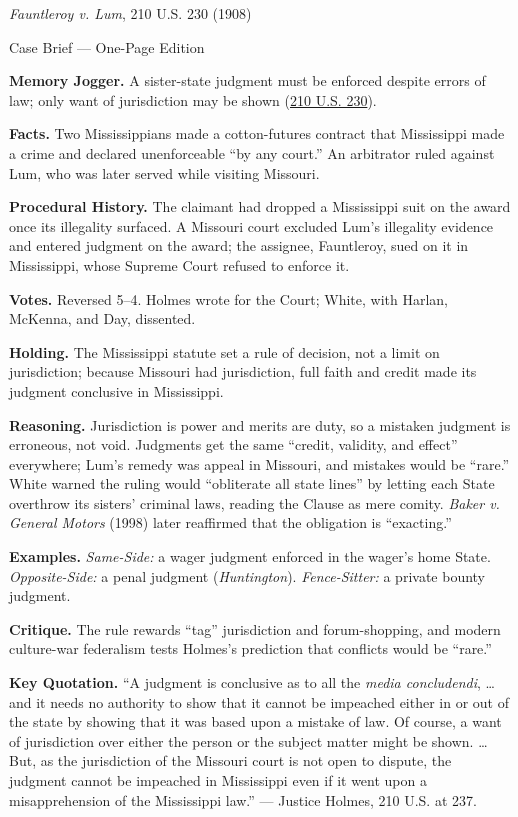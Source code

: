 \documentclass[12pt]{article}
\begin{document}
\begin{center}
{\Large \textit{Fauntleroy v. Lum}, 210 U.S. 230 (1908)\par}
\vspace{0.3em}
{\normalsize Case Brief --- One-Page Edition\par}
\end{center}

\textbf{Memory Jogger.} A sister-state judgment must be enforced despite errors of law; only want of jurisdiction may be shown (\href{https://supreme.justia.com/cases/federal/us/210/230/}{210 U.S. 230}).

\textbf{Facts.} Two Mississippians made a cotton-futures contract that Mississippi made a crime and declared unenforceable ``by any court.'' An arbitrator ruled against Lum, who was later served while visiting Missouri.

\textbf{Procedural History.} The claimant had dropped a Mississippi suit on the award once its illegality surfaced. A Missouri court excluded Lum's illegality evidence and entered judgment on the award; the assignee, Fauntleroy, sued on it in Mississippi, whose Supreme Court refused to enforce it.

\textbf{Votes.} Reversed 5--4. Holmes wrote for the Court; White, with Harlan, McKenna, and Day, dissented.

\textbf{Holding.} The Mississippi statute set a rule of decision, not a limit on jurisdiction; because Missouri had jurisdiction, full faith and credit made its judgment conclusive in Mississippi.

\textbf{Reasoning.} Jurisdiction is power and merits are duty, so a mistaken judgment is erroneous, not void. Judgments get the same ``credit, validity, and effect'' everywhere; Lum's remedy was appeal in Missouri, and mistakes would be ``rare.'' White warned the ruling would ``obliterate all state lines'' by letting each State overthrow its sisters' criminal laws, reading the Clause as mere comity. \textit{Baker v. General Motors} (1998) later reaffirmed that the obligation is ``exacting.''

\textbf{Examples.} \emph{Same-Side:} a wager judgment enforced in the wager's home State. \emph{Opposite-Side:} a penal judgment (\textit{Huntington}). \emph{Fence-Sitter:} a private bounty judgment.

\textbf{Critique.} The rule rewards ``tag'' jurisdiction and forum-shopping, and modern culture-war federalism tests Holmes's prediction that conflicts would be ``rare.''

\textbf{Key Quotation.} ``A judgment is conclusive as to all the \textit{media concludendi}, \ldots{} and it needs no authority to show that it cannot be impeached either in or out of the state by showing that it was based upon a mistake of law. Of course, a want of jurisdiction over either the person or the subject matter might be shown. \ldots{} But, as the jurisdiction of the Missouri court is not open to dispute, the judgment cannot be impeached in Mississippi even if it went upon a misapprehension of the Mississippi law.'' --- Justice Holmes, 210 U.S. at 237.
\end{document}

